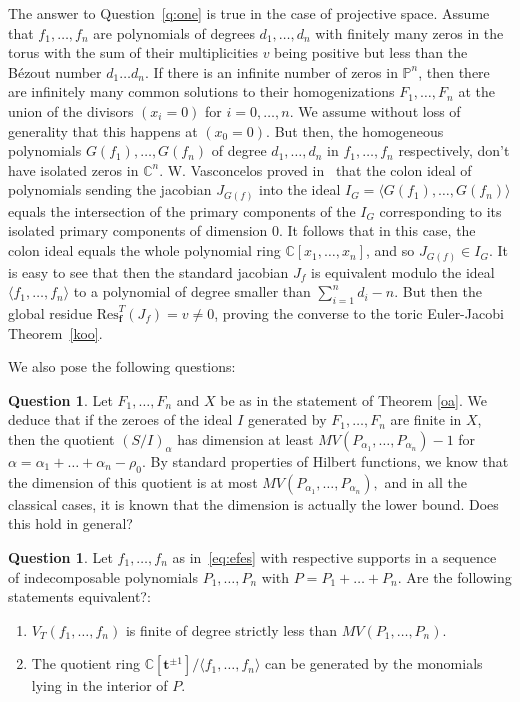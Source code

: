 \documentclass[a4paper,11pt]{amsart}
\newcommand{\C}{\mathbb{C}}
\renewcommand{\P}{\mathbb{P}}
\newcommand{\bff}{{\boldsymbol{f}}}
\newcommand{\bft}{{\boldsymbol{t}}}
\newcounter{thm}
\numberwithin{thm}{section}
\numberwithin{equation}{section}
\theoremstyle{definition}
\newtheorem{question}[thm]{Question}
\theoremstyle{plain}
\begin{document}
The answer to Question~\ref{q:one} is true in the case of projective space. Assume that $f_1, \dots, f_n$ are polynomials of degrees $d_1, \dots, d_n$ with finitely many zeros in the torus with the sum of their multiplicities $v$ being positive but less than the B\'ezout number $d_1\dots d_n$. If there is an infinite number of zeros in $\P^n$, then there are infinitely many common solutions
to their homogenizations $F_1, \dots, F_n$ at the union of the divisors  $(x_i=0)$ for $i=0, \dots, n$. We assume without loss of generality that this happens at $(x_0=0)$. But then,  the homogeneous polynomials $G(f_1),\dots, G(f_n)$ of  degree $d_1, \dots, d_n$ in $f_1, \dots, f_n$ respectively, don't have isolated zeros in $\C^n$. W. Vasconcelos proved in~\cite{vas92} that the colon ideal of  polynomials sending the jacobian $J_{G(f)}$ into the ideal $I_G = \langle G(f_1), \dots, G(f_n)\rangle$  equals the
intersection of the primary components of the $I_G$  corresponding to its
isolated primary components of dimension $0$. 
It follows that in this case, the colon ideal equals the whole polynomial ring $\C[x_1, \dots, x_n]$, and so 
$J_{G(f)} \in I_G$. It is easy to see that then the standard jacobian $J_f$ is equivalent
modulo the ideal $\langle f_1, \dots, f_n \rangle$ to a polynomial of degree smaller than $\sum_{i=1}^n d_i - n$. But then the global residue $\mbox{Res}^T_\bff(J_f) =v \not= 0$, proving the converse to the toric Euler-Jacobi Theorem~\ref{koo}.

\smallskip

We also pose the following questions:

\begin{question}
Let  $F_1, \dots,F_n$ and $X$ be as in the statement of Theorem \ref{oa}. We deduce that if the zeroes of the ideal  $I$  generated by $F_1, \dots,F_n$ are finite in $X$, then  the quotient  $(S/I)_{\alpha}$ has dimension at least $MV(P_{\alpha_1},\ldots, P_{\alpha_n})-1$ for $\alpha=\alpha_1+\ldots+\alpha_n-\rho_0$.  By standard properties of Hilbert functions, we know that the dimension of this quotient is at most $MV(P_{\alpha_1},\ldots, P_{\alpha_n}),$ and in all the classical cases, it is known that the dimension is actually the lower bound. Does this hold in general?
\end{question}


\begin{question}\label{question3}
Let $f_1, \dots, f_n$ as in~\eqref{eq:efes} with respective supports in a sequence of indecomposable polynomials 
$P_1, \dots, P_n$ with $P=P_1 + \dots + P_n$. Are the following statements equivalent?:
\begin{enumerate}
\item $V_{T}(f_1,\ldots, f_n)$ is finite of degree strictly less than $MV(P_1,\ldots, P_n)$.
\item The quotient ring $\C[\bft^{\pm1}]/\langle f_1,\ldots, f_n\rangle$ can be generated by the monomials lying in the interior of $P$.
\end{enumerate}
\end{question}
\end{document}
